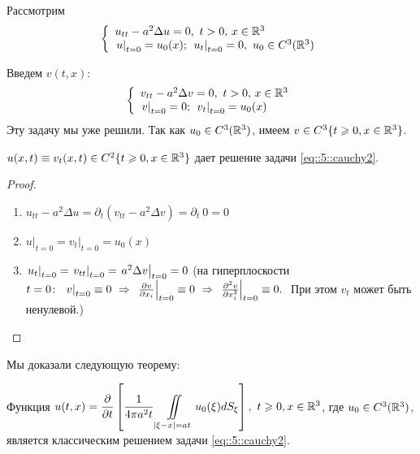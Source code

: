 \documentclass[../main.tex]{subfiles}
\begin{document}
Рассмотрим
\begin{equation}
\left\{
  \begin{array}{ll}
  u_{tt}-a^2\Delta u=0,\ t>0,\, x\in \mathbb{R}^3\\
  \left. u\right|_{t=0}=u_0(x);\ \left. u_t\right|_{t=0}=0,\ u_0\in C^3(\mathbb{R}^3)
  \end{array}
\right.
\label{eq::5::cauchy2}
\end{equation}

Введем $v(t, x)$:
\[
\left\{
  \begin{array}{ll}
  v_{tt}-a^2\Delta v=0,\ t>0,\, x\in \mathbb{R}^3\\
  \left. v\right|_{t=0}=0;\ \left. v_t\right|_{t=0}=u_0(x)
  \end{array}
\right.
\]
Эту задачу мы уже решили. Так как $u_0\in C^3(\mathbb{R}^3)$, имеем $v\in C^3\{t\geqslant 0, x\in\mathbb{R}^3\}$.
\begin{statement}
$u(x, t)\equiv v_t(x, t)\in C^2\{t\geqslant 0, x\in\mathbb{R}^3 \}$ дает решение задачи \eqref{eq::5::cauchy2}.
\end{statement}
\begin{proof}$\ $
\begin{enumerate}
\item $u_{tt} - a^2 \Delta u = \partial_t (v_{tt} - a^2 \Delta v) = \partial_t\: 0 = 0$
\item $\left. u\right|_{t=0}=\left. v_t\right|_{t=0}=u_0(x)$
\item $\left. u_t\right|_{t=0} = \left. v_{tt}\right|_{t=0}=\left. a^2 \Delta v\right|_{t=0}=0$ (на гиперплоскости $t=0\colon\ \while{v}{t=0} \equiv 0\ \Rightarrow\ \while{\pd{v}{x_i}}{t=0} \equiv 0\ \Rightarrow\ \while{\pdd{v}{x_i}}{t=0} \equiv 0.\;$ При этом $v_t$ может быть ненулевой.)
\end{enumerate}
\end{proof}
Мы доказали следующую теорему:
\begin{theorem}
Функция $u(t,x)=\dfrac{\partial}{\partial t}\left[\dfrac{1}{4\pi a^2t}\displaystyle\iint\limits_{|\xi -x|=at}u_0(\xi )dS_{\xi } \right],\ t\geqslant 0,x\in\mathbb{R}^3$, где $u_0\in C^3(\mathbb{R}^3)$, \\[1em]
является классическим решением задачи \eqref{eq::5::cauchy2}. 
\end{theorem}
\end{document}
